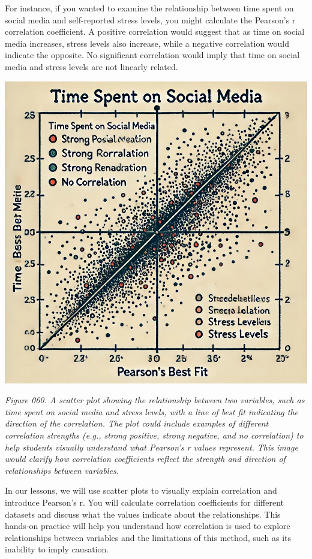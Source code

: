 \documentclass[
]{book}
\begin{document}
For instance, if you wanted to examine the relationship between time spent on social media and self-reported stress levels, you might calculate the Pearson's r correlation coefficient. A positive correlation would suggest that as time on social media increases, stress levels also increase, while a negative correlation would indicate the opposite. No significant correlation would imply that time on social media and stress levels are not linearly related.

\includegraphics[width=1\textwidth,height=\textheight]{images/fig060.jpg}

\emph{Figure 060. A scatter plot showing the relationship between two variables, such as time spent on social media and stress levels, with a line of best fit indicating the direction of the correlation. The plot could include examples of different correlation strengths (e.g., strong positive, strong negative, and no correlation) to help students visually understand what Pearson's r values represent. This image would clarify how correlation coefficients reflect the strength and direction of relationships between variables.}

In our lessons, we will use scatter plots to visually explain correlation and introduce Pearson's r. You will calculate correlation coefficients for different datasets and discuss what the values indicate about the relationships. This hands-on practice will help you understand how correlation is used to explore relationships between variables and the limitations of this method, such as its inability to imply causation.
\end{document}
